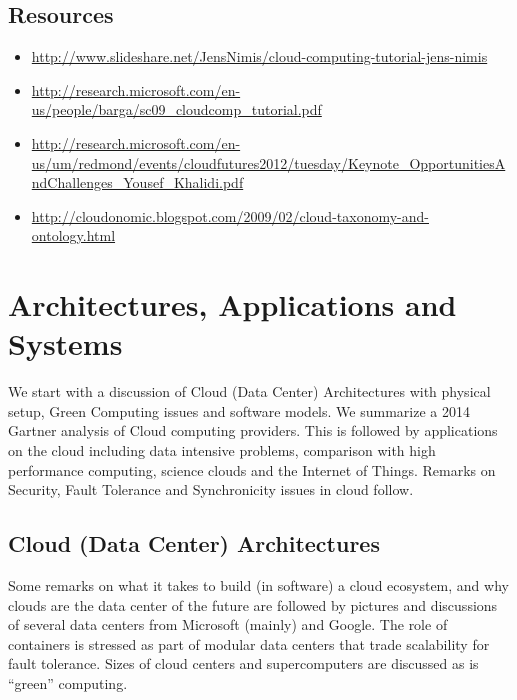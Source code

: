 \subsection{Resources}

\begin{itemize}
\item
  \url{http://www.slideshare.net/JensNimis/cloud-computing-tutorial-jens-nimis}
\item
  \url{http://research.microsoft.com/en-us/people/barga/sc09_cloudcomp_tutorial.pdf}
\item
  \url{http://research.microsoft.com/en-us/um/redmond/events/cloudfutures2012/tuesday/Keynote_OpportunitiesAndChallenges_Yousef_Khalidi.pdf}
\item
  \url{http://cloudonomic.blogspot.com/2009/02/cloud-taxonomy-and-ontology.html}
\end{itemize}

\section{Architectures,  Applications and Systems}

We start with a discussion of Cloud (Data Center) Architectures with
physical setup, Green Computing issues and software models. We summarize
a 2014 Gartner analysis of Cloud computing providers. This is followed
by applications on the cloud including data intensive problems,
comparison with high performance computing, science clouds and the
Internet of Things. Remarks on Security, Fault Tolerance and
Synchronicity issues in cloud follow.



\subsection{Cloud (Data Center) Architectures}

Some remarks on what it takes to build (in software) a cloud ecosystem,
and why clouds are the data center of the future are followed by
pictures and discussions of several data centers from Microsoft (mainly)
and Google. The role of containers is stressed as part of modular data
centers that trade scalability for fault tolerance. Sizes of cloud
centers and supercomputers are discussed as is ``green'' computing.



